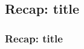 \subsection{{Recap: {title}}}
\begin{{frame}}
    \frametitle{{Recap: {title}}}
    \begin{{itemize}}
        \item
    \end{{itemize}}
\end{{frame}}
